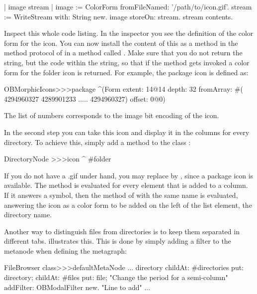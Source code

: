 \documentclass[a4paper,10pt,twoside]{book}
\begin{document}
\begin{code}{}
| image stream |
image := ColorForm fromFileNamed: '/path/to/icon.gif'.
stream := WriteStream with: String new.
image storeOn: stream.
stream contents.
\end{code}

Inspect this whole code listing. In the inspector you see the definition of the color form for the icon. You can now install the content of this  as a method in the method protocol  of  in a method called . Make sure that you do not return the string, but the code within the string, so that if the method gets invoked a color form for the folder icon is returned. For example, the package icon is defined as:

\begin{code}{}
OBMorphicIcons>>>package
    ^(Form
	extent: 14@14
	depth: 32
	fromArray: #( 4294960327 4289901233 .....  4294960327)
	offset: 0@0)
\end{code}

The list of numbers corresponds to the image bit encoding of the icon.

In the second step you can take this icon and display it in the columns for every directory. To achieve this, simply add a method  to the class :

\begin{code}{}
DirectoryNode >>>icon
	^ #folder  
\end{code}

If you do not have a .gif under hand, you may replace  by , since a package icon is available. The method  is evaluated for every element that is added to a column. If it answers a symbol, then the method of  with the same name is evaluated, answering the icon as a color form to be added on the left of the list element, \ie the directory name.

Another way to distinguish files from directories is to keep them separated in different tabs. 
 illustrates this. This is done by simply adding a filter to the  metanode when defining the metagraph:

\begin{code}{}
FileBrowser class>>>defaultMetaNode
    ...
    directory 
          childAt: #directories put: directory;
          childAt: #files put: file; 		   "Change the period for a semi-column"
	addFilter: OBModalFilter new.	 "Line to add"
    ...    
\end{code}
\end{document}
